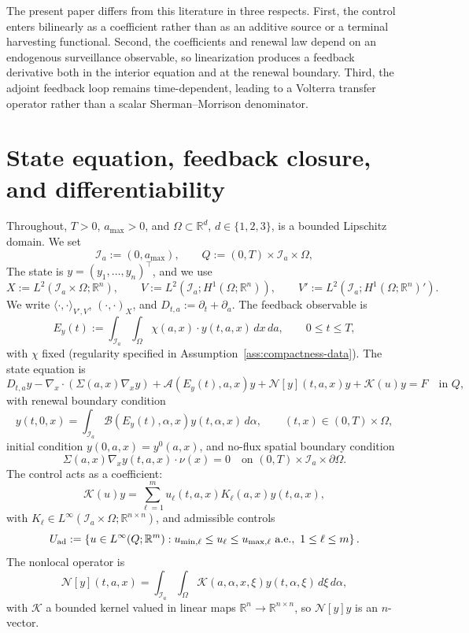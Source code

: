 \documentclass[pdflatex,sn-mathphys-num]{sn-jnl}
\theoremstyle{plain}
\theoremstyle{definition}
\theoremstyle{remark}
\newcommand{\R}{\mathbb R}
\begin{document}
The present paper differs from this literature in three respects. First, the
control enters bilinearly as a coefficient rather than as an additive source
or a terminal harvesting functional. Second, the coefficients and renewal law
depend on an endogenous surveillance observable, so linearization produces a
feedback derivative both in the interior equation and at the renewal boundary.
Third, the adjoint feedback loop remains time-dependent, leading to a
Volterra transfer operator rather than a scalar Sherman--Morrison denominator.

\section{State equation, feedback closure, and differentiability}
\label{sec:state-feedback-differentiability}
Throughout, $T>0$, $a_{\max}>0$, and $\Omega\subset\R^d$, $d\in\{1,2,3\}$, is a
bounded Lipschitz domain. 
We set
\[
\mathcal I_a:=(0,a_{\max}),\qquad
Q:=(0,T)\times  \mathcal I_a\times\Omega ,
\]
The state is
$y=(y_1,\ldots,y_n)^\top$, and we use
\[
X:=L^2(\mathcal I_a\times\Omega;\R^n),
\qquad
V:=L^2(\mathcal I_a;H^1(\Omega;\R^n)),
\qquad
V':=L^2(\mathcal I_a;H^1(\Omega;\R^n)').
\]
We write $\langle\cdot,\cdot\rangle_{V',V}$, $(\cdot,\cdot)_X$, and
$D_{t,a}:=\partial_t+\partial_a$. The feedback observable is
\[
E_y(t)
:=
\int_{\mathcal I_a}\int_\Omega
\chi(a,x)\cdot y(t,a,x)\,dx\,da ,
\qquad 0\le t\le T,
\]
with $\chi$ fixed (regularity specified in
Assumption~\ref{ass:compactness-data}). The state equation is
\begin{equation}
\label{eq:abstract-state-equation}
D_{t,a}y
-\nabla_x\cdot(\Sigma(a,x)\nabla_x y)
+
\mathcal A(E_y(t),a,x)y
+
\mathcal N[y](t,a,x)y
+
\mathcal K(u)y
=
F
\quad\text{in }Q,
\end{equation}
with renewal boundary condition
\[
y(t,0,x)
=
\int_{\mathcal I_a}
\mathcal B(E_y(t),\alpha,x)y(t,\alpha,x)\,d\alpha ,
\qquad (t,x)\in(0,T)\times\Omega,
\]
initial condition $y(0,a,x)=y^0(a,x)$, and no-flux spatial boundary condition
\begin{equation}
\label{eq:noflux-boundary}
\Sigma(a,x)\nabla_x y(t,a,x)\cdot\nu(x)=0
\quad\text{on }(0,T)\times \mathcal I_a\times\partial\Omega .
\end{equation}
The control acts as a coefficient:
\[
\mathcal K(u)y
=
\sum_{\ell=1}^m u_\ell(t,a,x)K_\ell(a,x)y(t,a,x),
\]
with $K_\ell\in L^\infty(\mathcal I_a\times\Omega;\R^{n\times n})$, and admissible
controls
\[
U_{\rm ad}
:=
\left\{
u\in L^\infty(Q;\R^m):
u_{\min,\ell}\le u_\ell\le u_{\max,\ell}
\ \text{a.e.},\ 1\le \ell\le m
\right\}.
\]
The nonlocal operator is
\[
\mathcal N[y](t,a,x)
=
\int_{\mathcal I_a}\int_\Omega
\mathscr K(a,\alpha,x,\xi)y(t,\alpha,\xi)\,d\xi\,d\alpha ,
\]
with $\mathscr K$ a bounded kernel valued in linear maps
$\R^n\to\R^{n\times n}$, so $\mathcal N[y]y$ is an $n$-vector.
\end{document}
